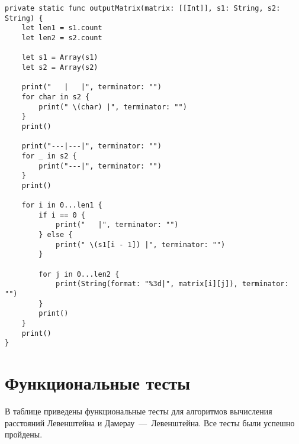 \clearpage

\begin{lstlisting}[label=lst:outputMatrix,caption=Функции вывода матрицы для алгоритмов поиска расстояния Левенштейна и Дамерау~---~Левенштейна]
private static func outputMatrix(matrix: [[Int]], s1: String, s2: String) {
	let len1 = s1.count
	let len2 = s2.count 

	let s1 = Array(s1)
	let s2 = Array(s2)

	print("   |   |", terminator: "")
	for char in s2 {
		print(" \(char) |", terminator: "")
	}
	print()

	print("---|---|", terminator: "")
	for _ in s2 {
		print("---|", terminator: "")
	}
	print()

	for i in 0...len1 {
		if i == 0 {
			print("   |", terminator: "")
		} else {
			print(" \(s1[i - 1]) |", terminator: "")
		}

		for j in 0...len2 {
			print(String(format: "%3d|", matrix[i][j]), terminator: "")
		}
		print()
	}
	print()
}
\end{lstlisting}

\clearpage

\section{Функциональные тесты}

В таблице приведены функциональные тесты для алгоритмов вычисления расстояний Левенштейна и Дамерау~---~Левенштейна. Все тесты были успешно пройдены.


